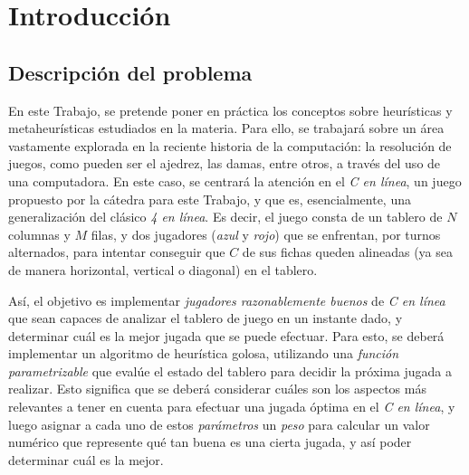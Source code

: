 \documentclass[12pt,a4paper]{article}
\begin{document}





\maketitle

\thispagestyle{empty}
\tableofcontents
\clearpage
\setcounter{page}{1}

\pagestyle{fancy}
\fancyhf{}
\rfoot{\centering \thepage}



\section{Introducción}

    \subsection{Descripción del problema}
    
    En este Trabajo, se pretende poner en práctica los conceptos sobre heurísticas y metaheurísticas estudiados en la materia. Para ello, se trabajará sobre un área vastamente explorada en la reciente historia de la computación: la resolución de juegos, como pueden ser el ajedrez, las damas, entre otros, a través del uso de una computadora. En este caso, se centrará la atención en el \textit{C en línea}, un juego propuesto por la cátedra para este Trabajo, y que es, esencialmente, una generalización del clásico \textit{4 en línea}. Es decir, el juego consta de un tablero de $N$ columnas y $M$ filas, y dos jugadores (\textit{azul} y \textit{rojo}) que se enfrentan, por turnos alternados, para intentar conseguir que $C$ de sus fichas queden alineadas (ya sea de manera horizontal, vertical o diagonal) en el tablero.
    
    Así, el objetivo es implementar \textit{jugadores razonablemente buenos} de \textit{C en línea} que sean capaces de analizar el tablero de juego en un instante dado, y determinar cuál es la mejor jugada que se puede efectuar. Para esto, se deberá implementar un algoritmo de heurística golosa, utilizando una \textit{función parametrizable} que evalúe el estado del tablero para decidir la próxima jugada a realizar. Esto significa que se deberá considerar cuáles son los aspectos más relevantes a tener en cuenta para efectuar una jugada óptima en el \textit{C en línea}, y luego asignar a cada uno de estos \textit{parámetros} un \textit{peso} para calcular un valor numérico que represente qué tan buena es una cierta jugada, y así poder determinar cuál es la mejor.
    
\end{document}
